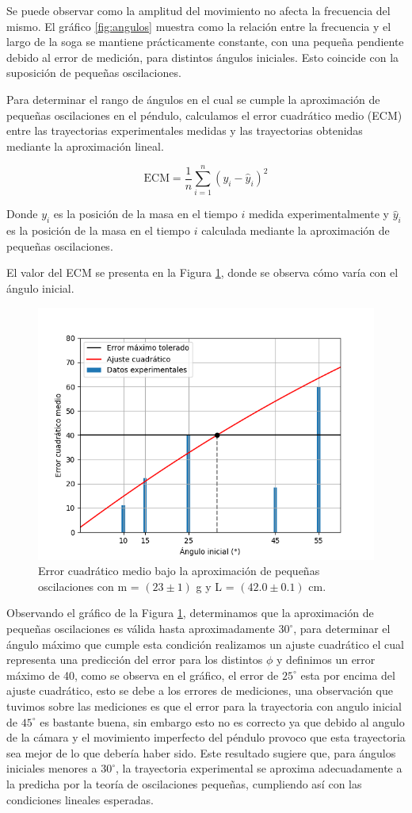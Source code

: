 \documentclass[12pt,a4]{article}
\begin{document}
Se puede observar como la amplitud del movimiento no afecta la frecuencia del mismo. El gráfico \ref{fig:angulos} muestra como la relación entre la frecuencia y el largo de la soga se mantiene prácticamente constante, con una pequeña pendiente debido al error de medición, para distintos ángulos iniciales. Esto coincide con la suposición de pequeñas oscilaciones.

Para determinar el rango de ángulos en el cual se cumple la aproximación de pequeñas oscilaciones en el péndulo, calculamos el error cuadrático medio (ECM) entre las trayectorias experimentales medidas y las trayectorias obtenidas mediante la aproximación lineal. 

\[
\text{ECM} = \frac{1}{n} \sum_{i=1}^{n} (y_i - \hat{y}_i)^2
\]

Donde $y_i$ es la posición de la masa en el tiempo $i$ medida experimentalmente y $\hat{y}_i$ es la posición de la masa en el tiempo $i$ calculada mediante la aproximación de pequeñas oscilaciones.

El valor del ECM se presenta en la Figura \ref{fig:pequeñas_oscilaciones}, donde se observa cómo varía con el ángulo inicial.

\begin{figure}[H]
    \centering
    \includegraphics[width=0.6\linewidth]{peq_oscilaciones.png}
    \caption{Error cuadrático medio bajo la aproximación de pequeñas oscilaciones con m = $(23\pm1)$ g y L = $(42.0\pm0.1)$ cm.}
    \label{fig:pequeñas_oscilaciones}
\end{figure}
Observando el gráfico de la Figura \ref{fig:pequeñas_oscilaciones}, determinamos que la aproximación de pequeñas oscilaciones es válida hasta aproximadamente $30^\circ$, para determinar el ángulo máximo que cumple esta condición realizamos un ajuste cuadrático el cual representa una predicción del error para los distintos $\phi$ y definimos un error máximo de 40, como se observa en el gráfico, el error de $25^\circ$ esta por encima del ajuste cuadrático, esto se debe a los errores de mediciones, una observación que tuvimos sobre las mediciones es que el error para la trayectoria con angulo inicial de $45^\circ$ es bastante buena, sin embargo esto no es correcto ya que debido al angulo de la cámara y el movimiento imperfecto del péndulo provoco que esta trayectoria sea mejor de lo que debería haber sido. Este resultado sugiere que, para ángulos iniciales menores a $30^\circ$, la trayectoria experimental se aproxima adecuadamente a la predicha por la teoría de oscilaciones pequeñas, cumpliendo así con las condiciones lineales esperadas.
\end{document}
